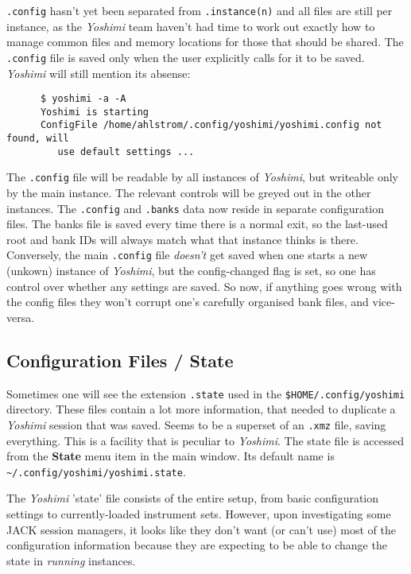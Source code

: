    \texttt{.config} hasn't yet been separated
   from \texttt{.instance(n)} and all files are still per instance, as the
   \textsl{Yoshimi} team haven't had time to work out exactly how to manage
   common files and memory locations for those that should be shared.  The
   \texttt{.config} file is saved only when the user explicitly calls for it to
   be saved.
   \textsl{Yoshimi} will still mention its absense:

   \begin{verbatim}
      $ yoshimi -a -A
      Yoshimi is starting
      ConfigFile /home/ahlstrom/.config/yoshimi/yoshimi.config not found, will
         use default settings ...
   \end{verbatim}

   The \texttt{.config} file will be readable by all instances of
   \textsl{Yoshimi}, but writeable only by the main instance. The relevant
   controls will be greyed out in the other instances.  The \texttt{.config} and
   \texttt{.banks} data now reside in separate configuration files.  The banks
   file is saved every time there is a normal exit, so the last-used root and
   bank IDs will always match what that instance thinks is there.  Conversely,
   the main \texttt{.config} file \textsl{doesn't} get saved when one starts a
   new (unkown) instance of \textsl{Yoshimi}, but the config-changed flag is
   set, so one has control over whether any settings are saved.  So now, if
   anything goes wrong with the config files they won't corrupt one's carefully
   organised bank files, and vice-versa.

\subsection{Configuration Files / State}
\label{subsec:configuration_state}

   Sometimes one will see the extension \texttt{.state} used in the
   \texttt{\$HOME/.config/yoshimi} directory.  These files contain a lot more
   information, that needed to duplicate a \textsl{Yoshimi} session that was
   saved.  Seems to be a superset of an \texttt{.xmz} file, saving everything.
   This is a facility that is peculiar to \textsl{Yoshimi}.
   The state file is accessed from the \textbf{State} menu item in the main
   window.
   Its default name is
   \texttt{\textasciitilde/.config/yoshimi/yoshimi.state}.

   The \textsl{Yoshimi} 'state' file consists of the entire setup, from basic
   configuration settings to currently-loaded instrument sets.
   However, upon investigating some JACK
   session managers, it looks like they don't want (or can't use) most of the
   configuration information because they are expecting to be able to change
   the state in \textsl{running} instances.

